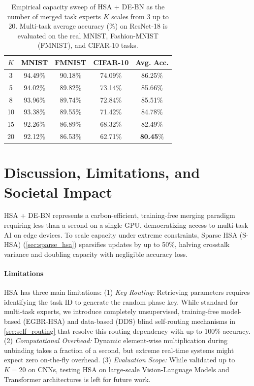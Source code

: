 \documentclass{article}
\theoremstyle{plain}
\theoremstyle{definition}
\theoremstyle{remark}
\begin{document}
\begin{table}[t]
\caption{Empirical capacity sweep of HSA + DE-BN as the number of merged task experts $K$ scales from 3 up to 20. Multi-task average accuracy (\%) on ResNet-18 is evaluated on the real MNIST, Fashion-MNIST (FMNIST), and CIFAR-10 tasks.}
\label{tab:capacity_sweep}
\vskip 0.05in
\begin{center}
\begin{footnotesize}
\setlength{\tabcolsep}{3.5pt}
\begin{tabular}{ccccc}
\toprule
$K$ & MNIST & FMNIST & CIFAR-10 & Avg. Acc. \\
\midrule
3 & 94.49\% & 90.18\% & 74.09\% & 86.25\% \\
5 & 94.02\% & 89.82\% & 73.14\% & 85.66\% \\
8 & 93.96\% & 89.74\% & 72.84\% & 85.51\% \\
10 & 93.38\% & 89.55\% & 71.42\% & 84.78\% \\
15 & 92.26\% & 86.89\% & 68.32\% & 82.49\% \\
20 & 92.12\% & 86.53\% & 62.71\% & \textbf{80.45}\% \\
\bottomrule
\end{tabular}
\end{footnotesize}
\end{center}
\vskip -0.15in
\end{table}

\enlargethispage{4\baselineskip}

\section{Discussion, Limitations, and Societal Impact}
HSA + DE-BN represents a carbon-efficient, training-free merging paradigm requiring less than a second on a single GPU, democratizing access to multi-task AI on edge devices. To scale capacity under extreme constraints, Sparse HSA (S-HSA) (\cref{sec:sparse_hsa}) sparsifies updates by up to 50\%, halving crosstalk variance and doubling capacity with negligible accuracy loss.

\paragraph{Limitations}
HSA has three main limitations: (1) \emph{Key Routing:} Retrieving parameters requires identifying the task ID to generate the random phase key. While standard for multi-task experts, we introduce completely unsupervised, training-free model-based (EGBR-HSA) and data-based (DDS) blind self-routing mechanisms in \cref{sec:self_routing} that resolve this routing dependency with up to 100\% accuracy. (2) \emph{Computational Overhead:} Dynamic element-wise multiplication during unbinding takes a fraction of a second, but extreme real-time systems might expect zero on-the-fly overhead. (3) \emph{Evaluation Scope:} While validated up to $K=20$ on CNNs, testing HSA on large-scale Vision-Language Models and Transformer architectures is left for future work.
\end{document}
